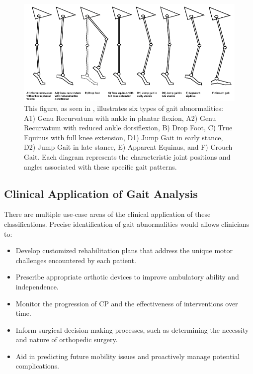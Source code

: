 \documentclass[UKenglish]{uiomasterthesis}
\begin{document}
\begin{figure}[ht]
    \centering
    \includegraphics[width=1\linewidth]{Figures/GaitImage.png}
    \caption{This figure, as seen in \cite{papageorgiou_systematic_2019}, illustrates six types of gait abnormalities: A1) Genu Recurvatum with ankle in plantar flexion, A2) Genu Recurvatum with reduced ankle dorsiflexion, B) Drop Foot, C) True Equinus with full knee extension, D1) Jump Gait in early stance, D2) Jump Gait in late stance, E) Apparent Equinus, and F) Crouch Gait. Each diagram represents the characteristic joint positions and angles associated with these specific gait patterns.}
    \label{fig:Gait Pattern}
\end{figure}

\subsection{Clinical Application of Gait Analysis}

There are multiple use-case areas of the clinical application of these classifications. Precise identification of gait abnormalities would allows clinicians to:

\begin{itemize}
    \item Develop customized rehabilitation plans that address the unique motor challenges encountered by each patient.
    \item Prescribe appropriate orthotic devices to improve ambulatory ability and independence.
    \item Monitor the progression of CP and the effectiveness of interventions over time.
    \item Inform surgical decision-making processes, such as determining the necessity and nature of orthopedic surgery.
    \item Aid in predicting future mobility issues and proactively manage potential complications.
\end{itemize}
\end{document}
